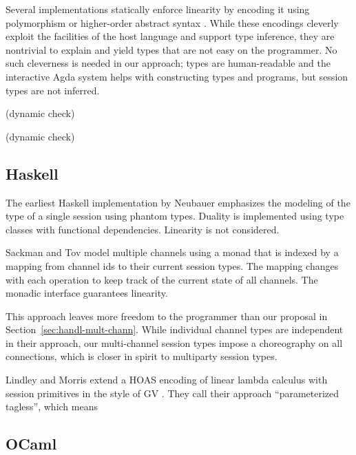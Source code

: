 \documentclass[acmsmall,screen,anonymous,review]{acmart}
\begin{document}
Several implementations statically enforce linearity by encoding it
using polymorphism \cite{DBLP:journals/scp/ImaiYY19} or higher-order
abstract syntax \cite{DBLP:conf/haskell/LindleyM16}. While these
encodings cleverly exploit the facilities of the host language and
support type inference, they
are nontrivial to explain and yield types that are not easy on the
programmer. No such cleverness is needed in our approach; types are
human-readable and the interactive Agda system helps with constructing
types and programs, but session types are not inferred.



\cite{DBLP:conf/fase/HuY16} (dynamic check)

\cite{DBLP:conf/fase/HuY17} (dynamic check)

\subsection{Haskell}
\label{sec:hask-impl}

The earliest Haskell implementation by Neubauer \cite{DBLP:conf/padl/NeubauerT04}
emphasizes the modeling of the type of a single session using phantom
types. Duality is implemented using type classes with functional
dependencies. Linearity is not considered.

Sackman \cite{SackmanE08} and Tov \cite{DBLP:conf/popl/TovP11} model
multiple channels using a monad that is indexed by a mapping
from channel ids to their current session types. The mapping changes
with each operation to keep track of the current state of all
channels. The monadic interface guarantees linearity.

This approach leaves more freedom to the programmer than our proposal
in Section~\ref{sec:handl-mult-chann}. While individual channel types
are independent in their approach, our multi-channel session types
impose a choreography on all connections, which is closer in spirit to
multiparty session types. 

Lindley and Morris \cite{DBLP:conf/haskell/LindleyM16} extend a HOAS
encoding of linear lambda calculus with session primitives in the
style of GV \cite{DBLP:journals/jfp/GayV10}. They call their approach
``parameterized tagless'', which means 

\cite{DBLP:conf/popl/OrchardY16} %

\subsection{OCaml}
\label{sec:ocaml}
\end{document}

